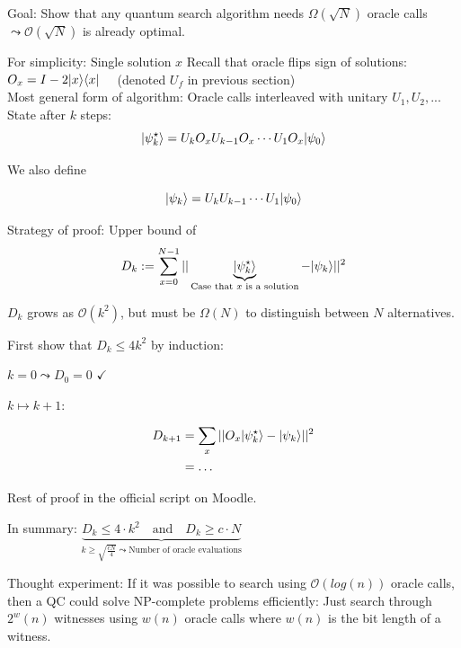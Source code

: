 Goal: Show that any quantum search algorithm needs $\Omega(\sqrt{N})$ oracle calls
$\leadsto \mathcal{O}(\sqrt{N})$ is already optimal.

For simplicity: Single solution $x$
Recall that oracle flips sign of solutions:
$O_x = I - 2 \lvert x\rangle\langle x\rvert \quad $ (denoted $U_f$ in previous section) \\
Most general form of algorithm: Oracle calls interleaved with unitary $U_1, U_2, ...$ \\

State after $k$ steps:
\begin{equation}
    \lvert\psi_k^\star\rangle = U_k O_x U_{k-1} O_x \cdots U_1 O_x \lvert\psi_0\rangle
\end{equation}

We also define

\begin{equation}
    \lvert\psi_k\rangle = U_k U_{k-1} \cdots U_1 \lvert\psi_0\rangle
\end{equation}

Strategy of proof: Upper bound of 
\begin{equation}
    D_k := \sum_{x = 0}^{N - 1} || \underbrace{\lvert\psi_k^\star\rangle}_{\text{Case that $x$ is a solution}} 
    - \lvert\psi_k\rangle ||^2
\end{equation}

$D_k$ grows as $\mathcal{O}(k^2)$, but must be $\Omega(N)$ to distinguish between $N$ alternatives.


First show that $D_k \leq 4 k^2$ by induction:

$k = 0 \leadsto D_0= 0$ {\color{green} $\checkmark$}

$k \mapsto k + 1$:

\begin{align*}
    D_{k + 1} &= \sum_x || O_x \lvert\psi_k^\star\rangle - \lvert\psi_k\rangle ||^2 \\
    &= \dots
\end{align*}

Rest of proof in the official script on Moodle.

In summary: $\underbrace{D_k \leq 4 \cdot k^2 \quad \text{and} \quad D_k \geq c \cdot N}
    _{k \geq \sqrt{\frac{cN}{4}} \leadsto \text{Number of oracle evaluations}}$


Thought experiment: If it was possible to search using $\mathcal{O}(log(n))$ oracle
calls, then a QC could solve NP-complete problems efficiently: 
Just search through $2^w(n)$ witnesses using $w(n)$ oracle calls where $w(n)$ is 
the bit length of a witness.